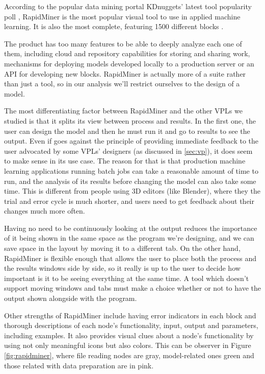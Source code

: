\begin{itemsize}
According to the popular data mining portal KDnuggets' latest tool popularity
poll \cite{kdn}, RapidMiner is the most popular visual tool to use in applied
machine learning. It is also the most complete, featuring 1500 different blocks \cite{rapidminer}.

The product has too many features to be able to deeply analyze each one of them,
including cloud and repository capabilities for storing and sharing work,
mechanisms for deploying models developed locally to a production server or
an API for developing new blocks. RapidMiner is actually more of a suite rather
than just a tool, so in our analysis we'll restrict ourselves to the design of
a model.

The most differentiating factor between RapidMiner and the other VPLs we studied
is that it splits its view between process and results. In the first one, the
user can design the model and then he must run it and go to results to see the output.
Even if goes against the principle of providing immediate feedback to the user
advocated by some VPLs' designers (as discussed in \ref{sec:vp}), it does seem to make
sense in its use case. The reason for that is that production machine learning applications
running batch jobs can take a reasonable amount of time to run, and the analysis
of its results before changing the model can also take some time. This is
different from people using 3D editors (like Blender), where they the trial and
error cycle is much shorter, and users need to get feedback about their changes
much more often.

Having no need to be continuously looking at the output reduces the importance
of it being shown in the same space as the program we're designing, and we can
save space in the layout by moving it to a different tab. On the other hand,
RapidMiner is flexible enough that allows the user to place both the process
and the results windows side by side, so it really is up to the user to decide
how important is it to be seeing everything at the same time. A tool which doesn't
support moving windows and tabs must make a choice whether or not to have the
output shown alongside with the program.

Other strengths of RapidMiner include having error indicators in each block
and thorough descriptions of each
node's functionality, input, output and parameters, including examples. It also
provides visual clues about a node's functionality by using not only meaningful
icons but also colors. This can be observer in Figure \ref{fig:rapidminer},
where file reading nodes are gray, model-related ones green and those related
with data preparation are in pink.


\end{itemsize}
